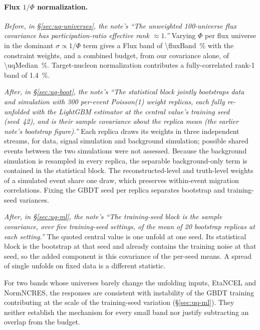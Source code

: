 \paragraph{Flux $1/\Phi$ normalization.}
\emph{Before, in \S\ref{sec:uq-universes}, the note's ``The unweighted 100-universe flux covariance has participation-ratio effective rank $\approx1$.''}
Varying $\Phi$ per flux universe in the dominant $\sigma\propto1/\Phi$ term gives a Flux band of \SI{\fluxBand}{\percent} with the constraint weights, and a combined budget, from our covariance alone, of \SI{\uqMedian}{\percent}. Target-nucleon normalization contributes a fully-correlated rank-1 band of \SI{1.4}{\percent}.

\emph{After, in \S\ref{sec:uq-boot}, the note's ``The statistical block jointly bootstraps data and simulation with 300 per-event Poisson(1) weight replicas, each fully re-unfolded with the LightGBM estimator at the central value's training seed (seed~42), and is their sample covariance about the replica mean (the earlier note's bootstrap figure).''}
Each replica draws its weights in three independent streams, for data, signal simulation and background simulation; possible shared events between the two simulations were not assessed. Because the background simulation is resampled in every replica, the separable background-only term is contained in the statistical block. The reconstructed-level and truth-level weights of a simulated event share one draw, which preserves within-event migration correlations. Fixing the GBDT seed per replica separates bootstrap and training-seed variances.

\emph{After, in \S\ref{sec:uq-ml}, the note's ``The training-seed block is the sample covariance, over five training-seed settings, of the mean of 20 bootstrap replicas at each setting.''}
The quoted central value is one unfold at one seed. Its statistical block is the bootstrap at that seed and already contains the training noise at that seed, so the added component is this covariance of the per-seed means. A spread of single unfolds on fixed data is a different statistic.

For two bands whose universes barely change the unfolding inputs, EtaNCEL and NormNCRES, the responses are consistent with instability of the GBDT training contributing at the scale of the training-seed variation (\S\ref{sec:uq-ml}). They neither establish the mechanism for every small band nor justify subtracting an overlap from the budget.


